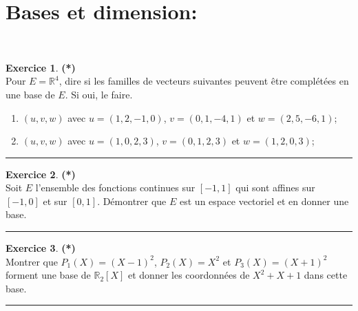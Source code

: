 \documentclass[a4paper,11pt]{article}
\theoremstyle{definition}
\newtheorem{exo}{Exercice} %
\begin{document}
\raggedright

\section*{Bases et dimension:}\hfill\\[-0.25cm]

   
\begin{minipage}{1\linewidth}\begin{minipage}[t]{0.48\linewidth}\raggedright
	
\begin{exo}\textbf{(*)}\quad\\[0.1cm]
Pour $E=\mathbb R^4$, dire si les familles de vecteurs suivantes
peuvent être complétées en une base de $E$. Si oui, le faire.
\begin{enumerate}
	\item $(u,v,w)$ avec $u=(1,2,-1,0)$, $v=(0,1,-4,1)$ et $w=(2,5,-6,1)$;
	\item $(u,v,w)$ avec $u=(1,0,2,3)$, $v=(0,1,2,3)$ et $w=(1,2,0,3)$;
\end{enumerate}

	
\centering\rule{1\linewidth}{0.6pt}\end{exo}



\begin{exo}\textbf{(*)}\quad\\[0.1cm]
	Soit $E$ l'ensemble des fonctions continues sur $[-1,1]$ qui sont affines sur $[-1,0]$ et sur $[0,1]$.
	Démontrer que $E$ est un espace vectoriel et en donner une base.
	
	\centering\rule{1\linewidth}{0.6pt}\end{exo}

\begin{exo}\textbf{(*)}\quad\\[0.1cm]
Montrer que $P_1(X)=(X-1)^2$, $P_2(X)=X^2$ et $P_3(X)=(X+1)^2$ forment une base de $\mathbb R_2[X]$ et donner les coordonnées de $X^2+X+1$ dans cette base.
	
	\centering\rule{1\linewidth}{0.6pt}\end{exo}


\end{minipage}\hfill\vrule\hfill\begin{minipage}[t]{0.48\linewidth}\raggedright



\end{minipage}
\end{minipage}
\end{document}
